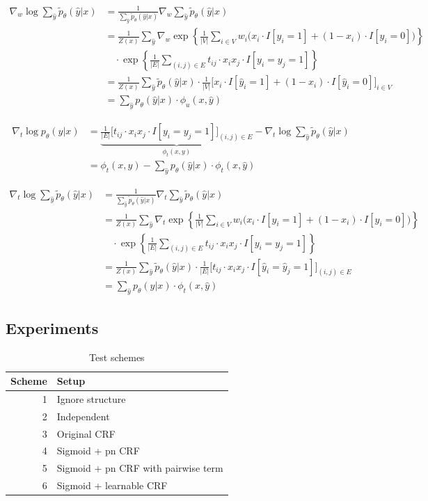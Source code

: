 \documentclass[11pt,a4paper]{article}
\begin{document}
\begin{align*}
\nabla_w\log\sum_{\hat{y}}\tilde{p}_\theta(\hat{y}|x)&=\frac{1}{\sum_{\hat{y}}\tilde{p}_\theta(\hat{y}|x)}\nabla_w\sum_{\hat{y}}\tilde{p}_\theta(\hat{y}|x)\\
&=\frac{1}{Z(x)}\sum_{\hat{y}}\nabla_w\exp\left\{\frac{1}{|V|}\sum_{i\in V}w_i\big(x_i\cdot I[y_i=1]+(1-x_i)\cdot I[y_i=0]\big)\right\}\\
&\quad\cdot\exp\left\{\frac{1}{|E|}\sum_{(i,j)\in E}t_{ij}\cdot x_ix_j\cdot I[y_i=y_j=1]\right\}\\
&=\frac{1}{Z(x)}\sum_{\hat{y}}\tilde{p}_\theta(\hat{y}|x)\cdot\frac{1}{|V|}\Big[x_i\cdot I[\hat{y}_i=1]+(1-x_i)\cdot I[\hat{y}_i=0]\Big]_{i\in V}\\
&=\sum_{\hat{y}}p_\theta(\hat{y}|x)\cdot\phi_u(x,\hat{y})
\end{align*}

\begin{align*}
\nabla_t\log p_\theta(y|x)&=\underbrace{\frac{1}{|E|}\Big[t_{ij}\cdot x_ix_j\cdot I[y_i=y_j=1]\Big]_{(i,j)\in E}}_{\phi_t(x,y)}-\nabla_t\log\sum_{\hat{y}}\tilde{p}_\theta(\hat{y}|x)\\
&=\phi_t(x,y)-\sum_{\hat{y}}p_\theta(\hat{y}|x)\cdot\phi_t(x,\hat{y})
\end{align*}

\begin{align*}
\nabla_t\log\sum_{\hat{y}}\tilde{p}_\theta(\hat{y}|x)&=\frac{1}{\sum_{\hat{y}}\tilde{p}_\theta(\hat{y}|x)}\nabla_t\sum_{\hat{y}}\tilde{p}_\theta(\hat{y}|x)\\
&=\frac{1}{Z(x)}\sum_{\hat{y}}\nabla_t\exp\left\{\frac{1}{|V|}\sum_{i\in V}w_i\big(x_i\cdot I[y_i=1]+(1-x_i)\cdot I[y_i=0]\big)\right\}\\
&\quad\cdot\exp\left\{\frac{1}{|E|}\sum_{(i,j)\in E}t_{ij}\cdot x_ix_j\cdot I[y_i=y_j=1]\right\}\\
&=\frac{1}{Z(x)}\sum_{\hat{y}}\tilde{p}_\theta(\hat{y}|x)\cdot\frac{1}{|E|}\Big[t_{ij}\cdot x_ix_j\cdot I[\hat{y}_i=\hat{y}_j=1]\Big]_{(i,j)\in E}\\
&=\sum_{\hat{y}}p_\theta(\hat{y}|x)\cdot\phi_t(x,\hat{y})
\end{align*}

\subsection{Experiments}
\label{sec:exp2}

\begin{table}[htbp]
\centering
\begin{tabular}{r|l}
Scheme & Setup\\
\hline
1 & Ignore structure\\
2 & Independent\\
3 & Original CRF\\
4 & Sigmoid + pn CRF\\
5 & Sigmoid + pn CRF with pairwise term\\
6 & Sigmoid + learnable CRF
\end{tabular}
\caption{Test schemes}
\end{table}
\end{document}
